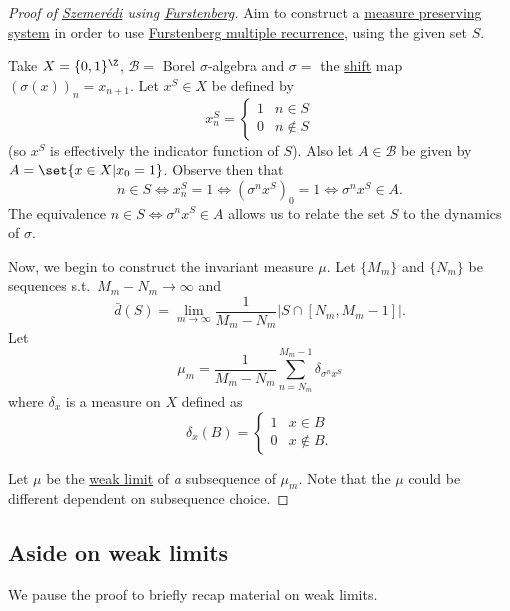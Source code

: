 \documentclass{article}
\begin{document}
\begin{proof}[Proof of \hyperlink{thm:sze}{Szemer\'edi} using \hyperlink{thm:furs}{Furstenberg}]
  Aim to construct a \hyperlink{def:mps}{measure preserving system} in order to use \hyperlink{thm:furs}{Furstenberg multiple recurrence}, using the given set $S$.

  Take $X = \{0, 1\}^\Z$, $\mathcal{B}=$ Borel $\sigma$-algebra and
  $\sigma=$ the \hyperlink{def:markovshift}{shift} map $(\sigma(x))_n = x_{n+1}$.
  Let $ {x}^S \in X$ be defined by
  \begin{equation*}
    {x}_n^S =
    \begin{cases}
      1 & n\in S\\
      0 & n \notin S
    \end{cases}
  \end{equation*}
  (so $x^S$ is effectively the indicator function of $S$).
  Also let $A\in\mathcal{B}$ be given by $A = \set{{x}\in X | x_0 = 1}$.
  Observe then that
  \begin{equation*}
    n\in S\iff x^S_n=1\iff (\sigma^n x^S)_0=1\iff \sigma^n x^S\in A.
  \end{equation*}
  The equivalence $n \in S \iff \sigma^n x^S \in A$ allows us to relate the set $S$ to the dynamics of $\sigma$.

  Now, we begin to construct the invariant measure $\mu$.
  Let $\{M_m\}$ and $\{N_m\}$ be sequences s.t.\ $ M_m-N_m\to\infty $ and
  \begin{equation*} \bar{d}(S) = \lim_{m\to\infty}\frac{1}{M_m-N_m}\left|S\cap[N_m,M_m-1]\right|. \end{equation*}
  Let
  \begin{equation*}
    \mu_m = \frac{1}{M_m-N_m}\sum_{n=N_m}^{M_m-1}\delta_{\sigma^n{x}^S}
  \end{equation*}
  where $\delta_x$ is a measure on $X$ defined as
  \begin{equation*}
    \delta_x(B) =
    \begin{cases}
      1 & x\in B\\
      0 & x\notin B.
    \end{cases}
  \end{equation*}

  Let $\mu$ be the \hyperlink{def:weaklimit}{weak limit} of \emph{a} subsequence of $\mu_m$.
  Note that the $\mu$ could be different dependent on subsequence choice.
  \renewcommand{\qedsymbol}{}
\end{proof}

\subsection{Aside on weak limits}
We pause the proof to briefly recap material on weak limits.
\end{document}
